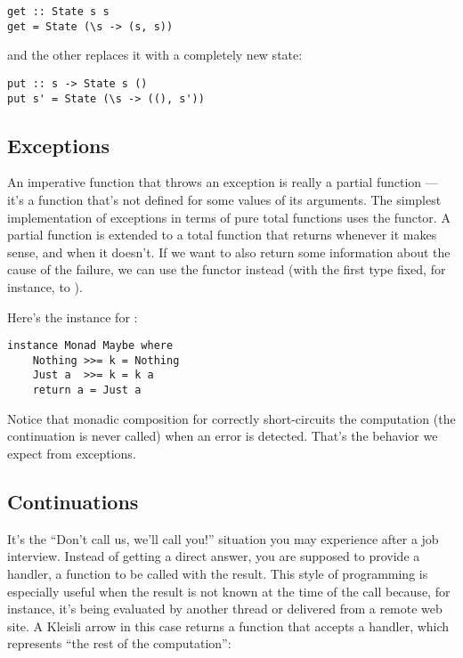 \begin{Verbatim}
get :: State s s
get = State (\s -> (s, s))
\end{Verbatim}
and the other replaces it with a completely new state:

\begin{Verbatim}
put :: s -> State s ()
put s' = State (\s -> ((), s'))
\end{Verbatim}

\subsection{Exceptions}\label{exceptions}

An imperative function that throws an exception is really a partial
function --- it's a function that's not defined for some values of its
arguments. The simplest implementation of exceptions in terms of pure
total functions uses the  functor. A partial function is
extended to a total function that returns  whenever it
makes sense, and  when it doesn't. If we want to also
return some information about the cause of the failure, we can use the
 functor instead (with the first type fixed, for
instance, to ).

Here's the  instance for :

\begin{Verbatim}[commandchars=\\\{\}]
instance Monad Maybe where
    Nothing >>= k = Nothing
    Just a  >>= k = k a
    return a = Just a
\end{Verbatim}
Notice that monadic composition for  correctly
short-circuits the computation (the continuation  is never
called) when an error is detected. That's the behavior we expect from
exceptions.

\subsection{Continuations}\label{continuations}

It's the ``Don't call us, we'll call you!'' situation you may experience
after a job interview. Instead of getting a direct answer, you are
supposed to provide a handler, a function to be called with the result.
This style of programming is especially useful when the result is not
known at the time of the call because, for instance, it's being
evaluated by another thread or delivered from a remote web site. A
Kleisli arrow in this case returns a function that accepts a handler,
which represents ``the rest of the computation'':

